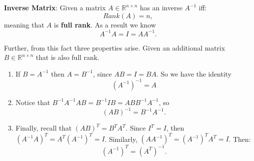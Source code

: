 \documentclass[12pt]{article}
\newenvironment{definition}[2][Definition]{\begin{trivlist}
\item[\hskip \labelsep {\bfseries #1}\hskip \labelsep {\bfseries #2}]}{\end{trivlist}}
\newenvironment{corollary}[2][Corollary]{\begin{trivlist}
\item[\hskip \labelsep {\bfseries #1}\hskip \labelsep {\bfseries #2}]}{\end{trivlist}}
\begin{document}
\begin{definition}{2.1} \textbf{Inverse Matrix}: Given a matrix \(A \in \mathbb{R}^{n \times n}\) has an inverse $A^{-1}$ iff: 
\[Rank(A) = n,\]
\noindent
meaning that $A$ is \textbf{full rank}. As a result we know
\[A^{-1} A = I = A A^{-1}.\]

\end{definition}

\begin{corollary}{2.1.1}
Further, from this fact three properties arise. Given an additional matrix \(B \in \mathbb{R}^{n \times n}\) that is also full rank.
\begin{enumerate}
    \item If \(B = A^{-1}\) then \(A = B^{-1}\), since \(AB = I = BA\). So we have the identity \[(A^{-1})^{-1} = A\]
    \item Notice that \(B^{-1}A^{-1}AB = B^{-1}IB = ABB^{-1}A^{-1}\), so \[(AB)^{-1} = B^{-1} A^{-1}.\]
    \item Finally, recall that \((AB)^T = B^T A^T\). Since \(I^T = I\), then \((A^{-1}A)^T = A^T(A^{-1})^T = I\). Similarly, \((AA^{-1})^T = (A^{-1})^T A^T = I\). Then: \[(A^{-1})^T = (A^T)^{-1}.\]
\end{enumerate}
\end{corollary}
\end{document}
